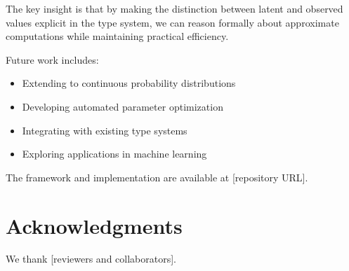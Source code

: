 \documentclass[11pt]{article}
\begin{document}
The key insight is that by making the distinction between latent and observed values explicit in the type system, we can reason formally about approximate computations while maintaining practical efficiency.

Future work includes:
\begin{itemize}
\item Extending to continuous probability distributions
\item Developing automated parameter optimization
\item Integrating with existing type systems
\item Exploring applications in machine learning
\end{itemize}

The framework and implementation are available at [repository URL].

\section*{Acknowledgments}
We thank [reviewers and collaborators].



\end{document}
